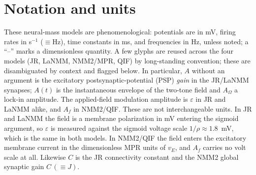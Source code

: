 \documentclass[11pt,a4paper]{article}
\begin{document}
\section{Notation and units}\label{app:notation}
These neural-mass models are phenomenological: potentials are in mV, firing rates in
s$^{-1}$ ($\equiv$Hz), time constants in ms, and frequencies in Hz, unless noted; a
``--'' marks a dimensionless quantity. A few glyphs are reused across the four models
(JR, LaNMM, NMM2/MPR, QIF) by long-standing convention; these are disambiguated by
context and flagged below. In particular, $A$ without an argument is the excitatory postsynaptic-potential (PSP) \emph{gain} in the
JR/LaNMM synapses; $A(t)$ is the instantaneous envelope of the two-tone field and
$A_\Omega$ a lock-in amplitude. The applied-field modulation amplitude is
$\varepsilon$ in JR and LaNMM alike, and $A_f$ in NMM2/QIF. These are not
interchangeable units. In JR and LaNMM the field is a membrane polarization in mV
entering the sigmoid argument, so $\varepsilon$ is measured against the sigmoid voltage
scale $1/\rho\approx1.8$~mV, which is the same in both models. In NMM2/QIF the field
enters the excitatory membrane current in the dimensionless MPR units of $v_E$, and
$A_f$ carries no volt scale at all. Likewise $C$ is the JR connectivity constant and the
NMM2 global synaptic gain $C\,(\equiv J)$.
\end{document}
